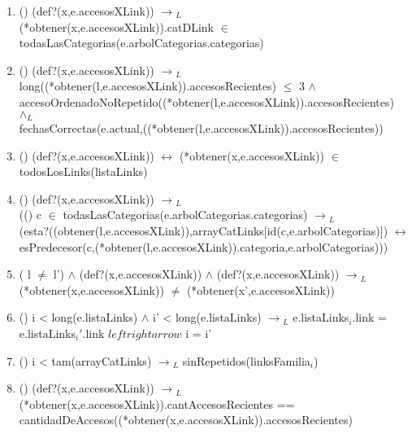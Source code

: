 \documentclass[10pt, a4paper]{article}
\begin{document}
	   \begin{enumerate}

	   \item () (def?(x,e.accesosXLink)) $\rightarrow{_L}$\\ (*obtener(x,e.accesosXLink)).catDLink $\in$ todasLasCategorias(e.arbolCategorias.categorias)

	   \item () (def?(x,e.accesosXLink)) $\rightarrow{_L}$ \\ long((*obtener(l,e.accesosXLink)).accesosRecientes) $\leq$ 3 $\wedge$ \\ 
	    accesoOrdenadoNoRepetido((*obtener(l,e.accesosXLink)).accesosRecientes) $\wedge{_L}$\\
	    fechasCorrectas(e.actual,((*obtener(l,e.accesosXLink)).accesosRecientes))

	   \item () (def?(x,e.accesosXLink)) $\leftrightarrow$ (*obtener(x,e.accesosXLink)) $\in$ todosLosLinks(listaLinks)

	    \item () (def?(x,e.accesosXLink)) $\rightarrow{_L}$ \\ (() c $\in$ todasLasCategorias(e.arbolCategorias.categorias) $\rightarrow{_L}$ \\
(esta?((obtener(l,e.accesosXLink)),arrayCatLinks[id(c,e.arbolCategorias)]) $\leftrightarrow$ esPredecesor(c,(*obtener(l,e.accesosXLink)).categoria,e.arbolCategorias)))

	   \item ( l $\neq$ l') $\wedge$ (def?(x,e.accesosXLink)) $\wedge$ (def?(x,e.accesosXLink)) $\rightarrow{_L}$ (*obtener(x,e.accesosXLink)) $\neq$ (*obtener(x',e.accesosXLink))
 
	   \item () i < long(e.listaLinks) $\wedge$ i' < long(e.listaLinks) $\rightarrow{_L}$ e.listaLinks${_i}$.link = e.listaLinks${_i'}$.link $leftrightarrow$ i = i'

	   \item () i < tam(arrayCatLinks) $\rightarrow{_L}$ sinRepetidos(linksFamilia${_i}$)

	   \item () (def?(x,e.accesosXLink)) $\rightarrow{_L}$ (*obtener(x,e.accesosXLink)).cantAccesosRecientes == cantidadDeAccesos((*obtener(x,e.accesosXLink)).accesosRecientes)

\end{enumerate}
\end{document}
